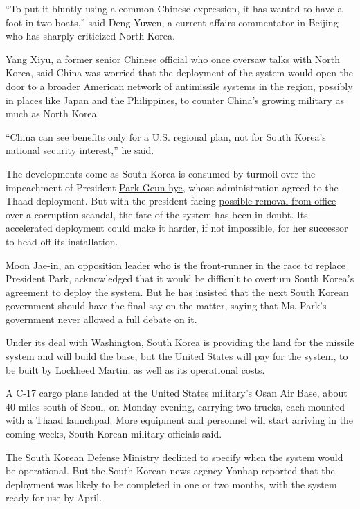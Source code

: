 ``To put it bluntly using a common Chinese expression, it has wanted to
have a foot in two boats,'' said Deng Yuwen, a current affairs
commentator in Beijing who has sharply criticized North Korea.

Yang Xiyu, a former senior Chinese official who once oversaw talks with
North Korea, said China was worried that the deployment of the system
would open the door to a broader American network of antimissile systems
in the region, possibly in places like Japan and the Philippines, to
counter China's growing military as much as North Korea.

``China can see benefits only for a U.S. regional plan, not for South
Korea's national security interest,'' he said.

The developments come as South Korea is consumed by turmoil over the
impeachment of President
\href{http://topics.nytimes.com/top/reference/timestopics/people/p/park_geunhye/index.html?inline=nyt-per}{Park
Geun-hye}, whose administration agreed to the Thaad deployment. But with
the president facing
\href{https://www.nytimes.com/2016/12/09/world/asia/south-korea-president-park-geun-hye-impeached.html}{possible
removal from office} over a corruption scandal, the fate of the system
has been in doubt. Its accelerated deployment could make it harder, if
not impossible, for her successor to head off its installation.

Moon Jae-in, an opposition leader who is the front-runner in the race to
replace President Park, acknowledged that it would be difficult to
overturn South Korea's agreement to deploy the system. But he has
insisted that the next South Korean government should have the final say
on the matter, saying that Ms. Park's government never allowed a full
debate on it.

Under its deal with Washington, South Korea is providing the land for
the missile system and will build the base, but the United States will
pay for the system, to be built by Lockheed Martin, as well as its
operational costs.

A C-17 cargo plane landed at the United States military's Osan Air Base,
about 40 miles south of Seoul, on Monday evening, carrying two trucks,
each mounted with a Thaad launchpad. More equipment and personnel will
start arriving in the coming weeks, South Korean military officials
said.

The South Korean Defense Ministry declined to specify when the system
would be operational. But the South Korean news agency Yonhap reported
that the deployment was likely to be completed in one or two months,
with the system ready for use by April.

